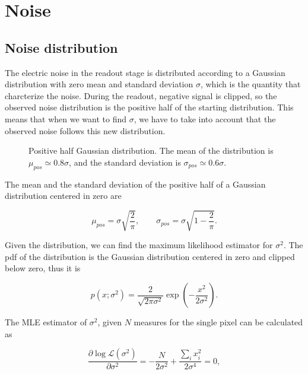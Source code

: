 \chapter{Noise}
\label{chap:noise}


\section{Noise distribution}

The electric noise in the readout stage is distributed according to a Gaussian distribution with zero mean and standard deviation $\sigma$, which is the quantity that charcterize the noise. During the readout, negative signal is clipped, so the observed noise distribution is the positive half of the starting distribution. This means that when we want to find $\sigma$, we have to take into account that the observed noise follows this new distribution.

\begin{figure}[h!]
    \centering
    \caption{Positive half Gaussian distribution. The mean of the distribution is $\mu_{pos} \simeq 0.8 \sigma$, and the standard deviation is $\sigma_{pos} \simeq 0.6 \sigma$. }
    \label{fig:half_gaussian}
\end{figure}
The mean and the standard deviation of the positive half of a Gaussian distribution centered in zero are

\begin{equation}
\mu_{pos} = \sigma \sqrt{\frac{2}{\pi}}, \quad \quad \sigma_{pos} = \sigma \sqrt{1 - \frac{2}{\pi}}.
\end{equation}

Given the distribution, we can find the maximum likelihood estimator for $\sigma^2$. The pdf of the distribution is the Gaussian distribution centered in zero and clipped below zero, thus it is

\begin{equation}
p(x; \sigma^2) = \frac{2}{\sqrt{2 \pi \sigma^2}} \exp{ \left( -\frac{x^2}{2\sigma^2} \right) }.
\end{equation}

The MLE estimator of $\sigma^2$, given $N$ measures for the single pixel can be calculated as

\begin{equation}
\frac{\partial \log \mathcal{L}(\sigma^2)}{\partial \sigma^2} = - \frac{N}{2\sigma^2} + \frac{\sum_i x_i^2}{2\sigma^4} = 0,
\end{equation}

